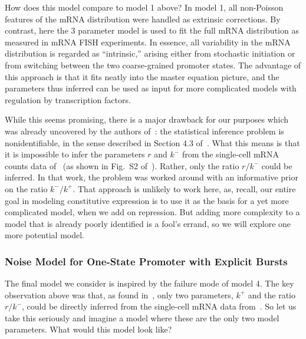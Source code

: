How does this model compare to model 1 above? In model 1, all non-Poisson
features of the mRNA distribution were handled as extrinsic corrections. By
contrast, here the 3 parameter model is used to fit the full mRNA distribution
as measured in mRNA FISH experiments. In essence, all variability in the mRNA
distribution is regarded as ``intrinsic,'' arising either from stochastic
initiation or from switching between the two coarse-grained promoter states. The
advantage of this approach is that it fits neatly into the master equation
picture, and the parameters thus inferred can be used as input for more
complicated models with regulation by transcription factors.

While this seems promising, there is a major drawback for our purposes which was
already uncovered by the authors of~\cite{Razo-Mejia2020}: the statistical
inference problem is nonidentifiable, in the sense described in Section 4.3
of~\cite{Gelman2013}. What this means is that it is impossible to infer the
parameters $r$ and $k^-$ from the single-cell mRNA counts data
of~\cite{Jones2014} (as shown in Fig.~S2 of~\cite{Razo-Mejia2020}). Rather, only
the ratio $r/k^-$ could be inferred. In that work, the problem was worked around
with an informative prior on the ratio $k^-/k^+$. That approach is unlikely to
work here, as, recall, our entire goal in modeling constitutive expression is to
use it as the basis for a yet more complicated model, when we add on repression.
But adding more complexity to a model that is already poorly identified is a
fool's errand, so we will explore one more potential model.


\subsubsection{Noise Model for One-State Promoter with Explicit Bursts}

The final model we consider is 
inspired by the failure mode of model 4. The key observation above
was that, as found in~\cite{Razo-Mejia2020}, only two parameters, $k^+$ and the
ratio $r/k^-$, could be directly inferred from the single-cell mRNA data
from~\cite{Jones2014}. So let us take this seriously and imagine a model where
these are the only two model parameters. What would this model look like?

